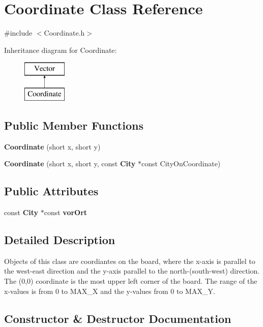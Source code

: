 \section{Coordinate Class Reference}
\label{class_coordinate}


{\ttfamily \#include $<$Coordinate.\-h$>$}

Inheritance diagram for Coordinate\-:\begin{figure}[H]
\begin{center}
\leavevmode
\includegraphics[height=2.000000cm]{class_coordinate}
\end{center}
\end{figure}
\subsection*{Public Member Functions}
\begin{DoxyCompactItemize}
\item 
{\bf Coordinate} (short x, short y)
\item 
{\bf Coordinate} (short x, short y, const {\bf City} $\ast$const City\-On\-Coordinate)
\end{DoxyCompactItemize}
\subsection*{Public Attributes}
\begin{DoxyCompactItemize}
\item 
const {\bf City} $\ast$const {\bf vor\-Ort}
\end{DoxyCompactItemize}


\subsection{Detailed Description}
Objects of this class are coordiantes on the board, where the x-\/axis is parallel to the west-\/east direction and the y-\/axis parallel to the north-\/(south-\/west) direction. The (0,0) coordinate is the most upper left corner of the board. The range of the x-\/values is from 0 to M\-A\-X\-\_\-\-X and the y-\/values from 0 to M\-A\-X\-\_\-\-Y. 

\subsection{Constructor \& Destructor Documentation}
